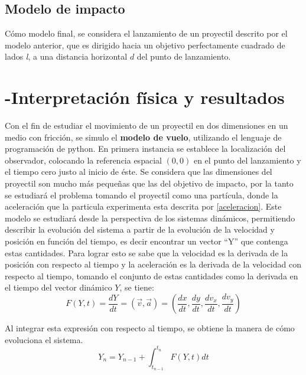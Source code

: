 \documentclass[11pt,letterpaper,twocolumn]{article}
\begin{document}
\subsection*{Modelo de impacto}
Cómo modelo final, se considera el lanzamiento de un proyectil descrito por el modelo anterior, que es dirigido hacia un objetivo perfectamente cuadrado de lados \emph{l}, a una distancia horizontal $d$ del punto de lanzamiento.  

\section*{-Interpretación física y resultados}
Con el fin de estudiar el movimiento de un proyectil en dos dimensiones en un medio con fricción, se simulo el \textbf{modelo de vuelo}, utilizando el lenguaje de programación de python. En primera instancia se establece la localización del observador, colocando la referencia espacial $(0,0)$ en el punto del lanzamiento y el tiempo cero justo al inicio de éste. Se considera que las dimensiones del proyectil son mucho más pequeñas que las del objetivo de impacto, por la tanto se estudiará el problema tomando el proyectil como una partícula, donde la aceleración que la particula experimenta esta descrita por \ref{aceleracion}. Este modelo se estudiará desde la perspectiva de los sistemas dinámicos, permitiendo describir la evolución del sistema a partir de la evolución de la velocidad y posición en función del tiempo, es decir encontrar un vector “Y” que contenga estas cantidades. Para lograr esto se sabe que la velocidad es la derivada de la posición con respecto al tiempo y la aceleración es la derivada de la velocidad con respecto al tiempo, tomando el conjunto de estas cantidades como la derivada en el tiempo del vector dinámico $Y$, se tiene:\\ 

$$ F(Y,t)=\dfrac{dY}{dt}=(\vec{v},\vec{a})=( \dfrac{dx}{dt},\dfrac{dy}{dt},\dfrac{dv_{x}}{dt},\dfrac{dv_{y}}{dt}) $$
\par 
Al integrar esta expresión con respecto al tiempo, se obtiene la manera de cómo evoluciona el sistema.\\

$$ Y_{n}= Y_{n-1} + \int_{t_{n-1}}^{t_{n}} F(Y,t)dt  $$
\end{document}
